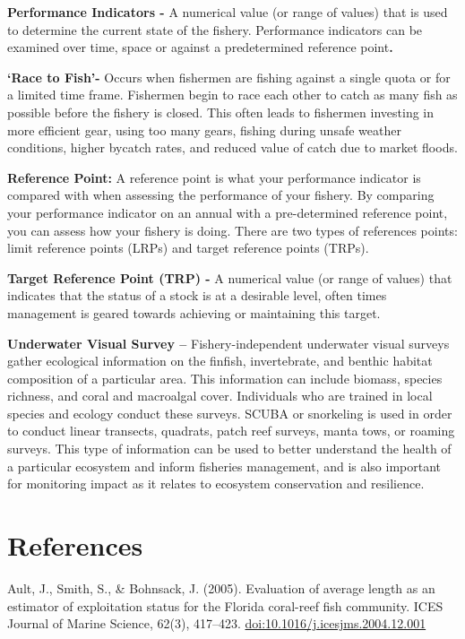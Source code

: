 \documentclass[]{book}
\begin{document}
\textbf{Performance Indicators -} A numerical value (or range of values)
that is used to determine the current state of the fishery. Performance
indicators can be examined over time, space or against a predetermined
reference point\textbf{.}

\textbf{`Race to Fish'-} Occurs when fishermen are fishing against a
single quota or for a limited time frame. Fishermen begin to race each
other to catch as many fish as possible before the fishery is closed.
This often leads to fishermen investing in more efficient gear, using
too many gears, fishing during unsafe weather conditions, higher bycatch
rates, and reduced value of catch due to market floods.

\textbf{Reference Point:} A reference point is what your performance
indicator is compared with when assessing the performance of your
fishery. By comparing your performance indicator on an annual with a
pre-determined reference point, you can assess how your fishery is
doing. There are two types of references points: limit reference points
(LRPs) and target reference points (TRPs).

\textbf{Target Reference Point (TRP) -} A numerical value (or range of
values) that indicates that the status of a stock is at a desirable
level, often times management is geared towards achieving or maintaining
this target.

\textbf{Underwater Visual Survey --} Fishery-independent underwater
visual surveys gather ecological information on the finfish,
invertebrate, and benthic habitat composition of a particular area. This
information can include biomass, species richness, and coral and
macroalgal cover. Individuals who are trained in local species and
ecology conduct these surveys. SCUBA or snorkeling is used in order to
conduct linear transects, quadrats, patch reef surveys, manta tows, or
roaming surveys. This type of information can be used to better
understand the health of a particular ecosystem and inform fisheries
management, and is also important for monitoring impact as it relates to
ecosystem conservation and resilience.

\chapter{References}\label{references}

Ault, J., Smith, S., \& Bohnsack, J. (2005). Evaluation of average
length as an estimator of exploitation status for the Florida coral-reef
fish community. ICES Journal of Marine Science, 62(3), 417--423.
\url{doi:10.1016/j.icesjms.2004.12.001}
\end{document}
